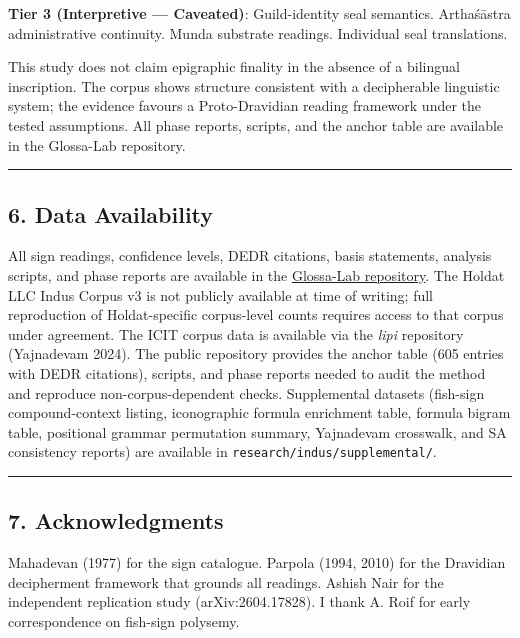 \documentclass[
  11pt,
]{article}
\begin{document}
\textbf{Tier 3 (Interpretive --- Caveated)}: Guild-identity seal
semantics. Arthaśāstra administrative continuity. Munda substrate
readings. Individual seal translations.

This study does not claim epigraphic finality in the absence of a
bilingual inscription. The corpus shows structure consistent with a
decipherable linguistic system; the evidence favours a Proto-Dravidian
reading framework under the tested assumptions. All phase reports,
scripts, and the anchor table are available in the Glossa-Lab
repository.

\begin{center}\rule{0.5\linewidth}{0.5pt}\end{center}

\subsection{6. Data Availability}\label{data-availability}

All sign readings, confidence levels, DEDR citations, basis statements,
analysis scripts, and phase reports are available in the
\href{https://github.com/BitConcepts/glossa-lab}{Glossa-Lab repository}.
The Holdat LLC Indus Corpus v3 is not publicly available at time of
writing; full reproduction of Holdat-specific corpus-level counts
requires access to that corpus under agreement. The ICIT corpus
data is available via the \emph{lipi} repository (Yajnadevam 2024). The
public repository provides the anchor table (605 entries with DEDR
citations), scripts, and phase reports needed to audit the method and
reproduce non-corpus-dependent checks. Supplemental datasets (fish-sign
compound-context listing, iconographic formula enrichment table, formula
bigram table, positional grammar permutation summary, Yajnadevam
crosswalk, and SA consistency reports) are available in
\texttt{research/indus/supplemental/}.

\begin{center}\rule{0.5\linewidth}{0.5pt}\end{center}

\subsection{7. Acknowledgments}\label{acknowledgments}

Mahadevan (1977) for the sign catalogue. Parpola (1994, 2010) for the
Dravidian decipherment framework that grounds all readings. Ashish Nair
for the independent replication study (arXiv:2604.17828). I thank A.
Roif for early correspondence on fish-sign polysemy.
\end{document}
